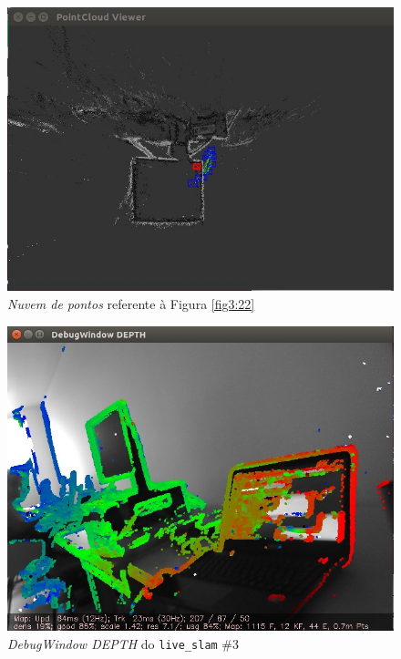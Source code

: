 \begin{figure}[H]
	\centering
		\includegraphics[width= \textwidth]{Imagens/figura3-23.jpg}
	\caption{\textit{Nuvem de pontos} referente à Figura \ref{fig3:22}}
	\label{fig3:23}
\end{figure}

\begin{figure}[H]
	\centering
		\includegraphics[width= \textwidth]{Imagens/figura3-24.jpg}
	\caption{\textit{DebugWindow DEPTH} do \texttt{live\_slam} \#3}
	\label{fig3:24}
\end{figure}

